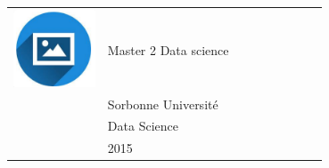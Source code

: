 \documentclass{article}
\begin{document}
\begin{paracol}{2}
 \begin{tabular}{@{}cp{0.7\linewidth}}
      \begin{minipage}{0.05\linewidth}
        \includegraphics[width=\linewidth]{picon.png}
      \end{minipage} & \vspace{-12pt}
      {\color{sidetext} Master 2 Data science} \\[-6pt]
      & Sorbonne Université \\
      & Data Science \\
      & 2015 
    \end{tabular}


~

~


\end{paracol}
\end{document}
